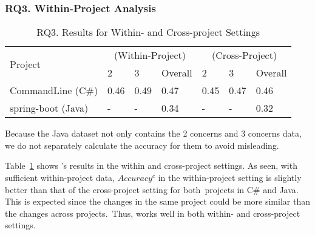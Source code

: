 \subsubsection{{\bf RQ3. Within-Project Analysis}}

\begin{table}[t]
	\caption{RQ3. Results for Within- and Cross-project Settings}
	\vspace{-12pt}
	\begin{center}
		\footnotesize
		\tabcolsep 3pt
		\renewcommand{\arraystretch}{1} \begin{tabular}{p{2cm}<{\centering}|p{0.8cm}<{\centering}p{0.8cm}<{\centering}p{0.8cm}<{\centering}|p{0.8cm}<{\centering}p{0.8cm}<{\centering}p{0.8cm}<{\centering}}
			
			\hline
			\multirow{2}{*}{Project}     & \multicolumn{3}{c|}{\tool (Within-Project)} & \multicolumn{3}{c}{\tool (Cross-Project)}\\
			\cline{2-7}
			                               &        2       &      3         & Overall  &      2       &        3     & Overall    \\
			
			\hline
			CommandLine (C\#)   &  0.46  & 0.49  &     0.47          &	0.45   & 0.47 &	0.46	       \\
           spring-boot (Java)   &  -     & -     &     0.34          &	-      & -    &	0.32	       \\

			\hline
		\end{tabular}
		\label{RQ3-result}
		Because the Java dataset not only contains the 2 concerns and 3 concerns data, we do not separately calculate the accuracy for them to avoid misleading.
	\end{center}
\end{table}


Table~\ref{RQ3-result} shows {\tool}'s results
in the within and cross-project settings. As seen, with sufficient
within-project data, $Accuracy^{c}$ in the within-project setting is
slightly better than that of the cross-project setting for
both~projects in C\# and Java.
This is expected since the changes in the same project could be
more similar than the changes across projects.~Thus, {\tool} works
well in both within- and cross-project settings.

